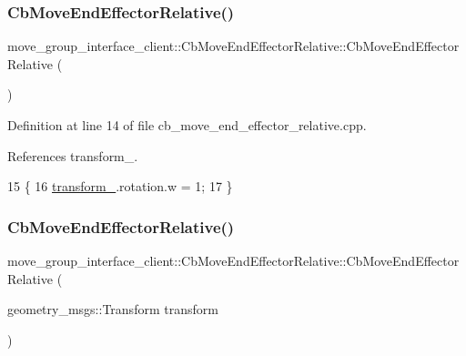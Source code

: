 \subsubsection{\texorpdfstring{Cb\+Move\+End\+Effector\+Relative()}{CbMoveEndEffectorRelative()}\hspace{0.1cm}{\footnotesize\ttfamily [1/2]}}
{\footnotesize\ttfamily move\+\_\+group\+\_\+interface\+\_\+client\+::\+Cb\+Move\+End\+Effector\+Relative\+::\+Cb\+Move\+End\+Effector\+Relative (\begin{DoxyParamCaption}{ }\end{DoxyParamCaption})}



Definition at line 14 of file cb\+\_\+move\+\_\+end\+\_\+effector\+\_\+relative.\+cpp.



References transform\+\_\+.


\begin{DoxyCode}
15     \{
16         \hyperlink{classmove__group__interface__client_1_1CbMoveEndEffectorRelative_a180b4e40316bc8d8d578c98b2fac068f}{transform\_}.rotation.w = 1;
17     \}
\end{DoxyCode}
\mbox{\label{classmove__group__interface__client_1_1CbMoveEndEffectorRelative_acd4b8a675f6f1d93dd342ed8a6570da8}} 
\subsubsection{\texorpdfstring{Cb\+Move\+End\+Effector\+Relative()}{CbMoveEndEffectorRelative()}\hspace{0.1cm}{\footnotesize\ttfamily [2/2]}}
{\footnotesize\ttfamily move\+\_\+group\+\_\+interface\+\_\+client\+::\+Cb\+Move\+End\+Effector\+Relative\+::\+Cb\+Move\+End\+Effector\+Relative (\begin{DoxyParamCaption}\item[{geometry\+\_\+msgs\+::\+Transform}]{transform }\end{DoxyParamCaption})}



